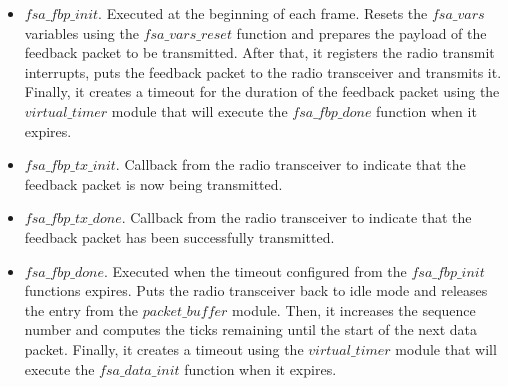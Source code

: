 \begin{itemize}
\item $fsa\_fbp\_init$. Executed at the beginning of each frame. Resets the $fsa\_vars$ variables using the $fsa\_vars\_reset$ function and prepares the payload of the feedback packet to be transmitted. After that, it registers the radio transmit interrupts, puts the feedback packet to the radio transceiver and transmits it. Finally, it creates a timeout for the duration of the feedback packet using the $virtual\_timer$ module that will execute the $fsa\_fbp\_done$ function when it expires.
\item $fsa\_fbp\_tx\_init$. Callback from the radio transceiver to indicate that the feedback packet is now being transmitted.
\item $fsa\_fbp\_tx\_done$. Callback from the radio transceiver to indicate that the feedback packet has been successfully transmitted.
\item $fsa\_fbp\_done$. Executed when the timeout configured from the $fsa\_fbp\_init$ functions expires. Puts the radio transceiver back to idle mode and releases the entry from the $packet\_buffer$ module. Then, it increases the sequence number and computes the ticks remaining until the start of the next data packet. Finally, it creates a timeout using the $virtual\_timer$ module that will execute the $fsa\_data\_init$ function when it expires.


\end{itemize}
